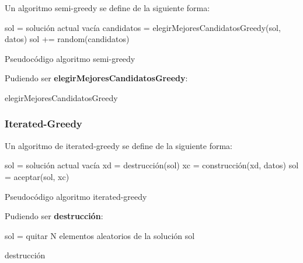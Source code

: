 \documentclass[13pt,a4paper]{article}
\begin{document}
Un algoritmo semi-greedy se define de la siguiente forma:

\begin{algorithm}[H]
    \SetAlgoLined
        sol = solución actual vacía \;
         {
            candidatos = elegirMejoresCandidatosGreedy(sol, datos) \;
            sol += random(candidatos) \;
        }        
    \caption{Pseudocódigo algoritmo semi-greedy}
\end{algorithm}

\vspace{\baselineskip}

Pudiendo ser \textbf{elegirMejoresCandidatosGreedy}:

\begin{algorithm}[H]
    \SetAlgoLined
    \caption{elegirMejoresCandidatosGreedy}
\end{algorithm}


\newpage

\subsubsection{Iterated-Greedy}

Un algoritmo de iterated-greedy se define de la siguiente forma:

\begin{algorithm}[H]
    \SetAlgoLined
        sol = solución actual vacía \;
         {
            xd = destrucción(sol) \;
            xc = construcción(xd, datos) \;
            sol = aceptar(sol, xc) \;
        }        
    \caption{Pseudocódigo algoritmo iterated-greedy}
\end{algorithm}

\vspace{\baselineskip}

Pudiendo ser \textbf{destrucción}:

\begin{algorithm}[H]
    \SetAlgoLined
        sol = quitar N elementos aleatorios de la solución sol \;
    \caption{destrucción}
\end{algorithm}
\end{document}
